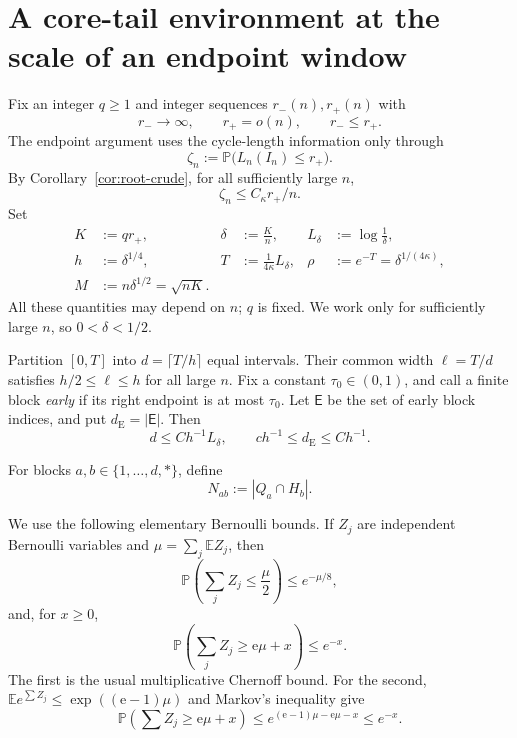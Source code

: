 \documentclass[11pt]{article}
\newcommand{\E}{\mathbb E}
\newcommand{\Pp}{\mathbb P}
\newcommand{\1}{\mathbf 1}
\theoremstyle{definition}
\theoremstyle{remark}
\begin{document}
\section{A core-tail environment at the scale of an endpoint window}
\label{sec:environment}

Fix an integer $q\geq1$ and integer sequences $r_-(n),r_+(n)$ with
\[
 r_-\longrightarrow\infty,
 \qquad r_+=o(n),
 \qquad r_-\leq r_+.
\]
The endpoint argument uses the cycle-length information only through
\begin{equation}\label{eq:local-root-escape}
 \zeta_n:=\Pp\bigl(L_n(I_n)\leq r_+\bigr).
\end{equation}
By Corollary~\ref{cor:root-crude}, for all sufficiently large $n$,
\begin{equation}\label{eq:zeta-quantitative}
 \zeta_n\leq C_\kappa r_+/n.
\end{equation}
Set
\begin{equation}\label{eq:parameters}
 \begin{aligned}
 K&:=q r_+,
 &\delta&:=\frac Kn,
 &L_\delta&:=\log\frac1\delta,\\
 h&:=\delta^{1/4},
 &T&:=\frac{1}{4\kappa}L_\delta,
 &\rho&:=e^{-T}=\delta^{1/(4\kappa)},\\
 M&:=n\delta^{1/2}=\sqrt{nK}.
 \end{aligned}
\end{equation}
All these quantities may depend on $n$; $q$ is fixed.  We work only for
sufficiently large $n$, so $0<\delta<1/2$.

Partition $[0,T]$ into $d=\lceil T/h\rceil$ equal intervals.  Their
common width $\ell=T/d$ satisfies $h/2\leq\ell\leq h$ for all large
$n$.  Fix a constant $\tau_0\in(0,1)$, and call a finite block \emph{early}
if its right endpoint is at most $\tau_0$.  Let $\mathsf E$ be the set of
early block indices, and put $d_{\mathrm E}=|\mathsf E|$.  Then
\begin{equation}\label{eq:d-e-bounds}
 d\leq C h^{-1}L_\delta,
 \qquad
 c h^{-1}\leq d_{\mathrm E}\leq C h^{-1}.
\end{equation}

For blocks $a,b\in\{1,\dots,d,*\}$, define
\begin{equation}\label{eq:Nab-initial}
  N_{ab}:=|Q_a\cap H_b|.
\end{equation}

We use the following elementary Bernoulli bounds.  If $Z_j$ are
independent Bernoulli variables and $\mu=\sum_j\E Z_j$, then
\begin{equation}\label{eq:chernoff-lower}
  \Pp\left(\sum_jZ_j\leq\frac\mu2\right)\leq e^{-\mu/8},
\end{equation}
and, for $x\geq0$,
\begin{equation}\label{eq:chernoff-upper}
  \Pp\left(\sum_jZ_j\geq \mathrm e\mu+x\right)\leq e^{-x}.
\end{equation}
The first is the usual multiplicative Chernoff bound.  For the second,
$\E e^{\sum Z_j}\leq\exp((\mathrm e-1)\mu)$ and Markov's inequality give
\[
 \Pp\left(\sum Z_j\geq \mathrm e\mu+x\right)
 \leq e^{(\mathrm e-1)\mu-\mathrm e\mu-x}\leq e^{-x}.
\]
\end{document}
